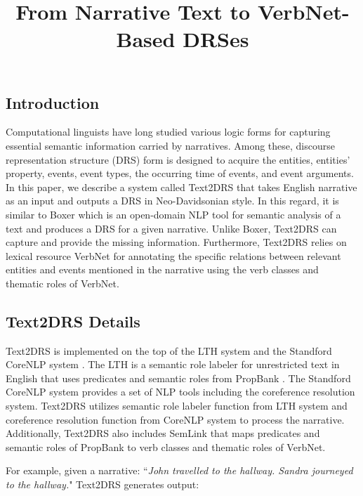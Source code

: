 \documentclass[12pt,letterpaper]{article}
\title{\vspace{-2.5cm}\myfont From Narrative Text to VerbNet-Based DRSes}
\author{}
\date{\vspace{-5ex}}
\begin{document}
	
	\maketitle
	\subsection*{\small Introduction}
	\noindent Computational linguists have long studied various logic forms for capturing essential semantic information carried by narratives. Among these, discourse representation structure (DRS) \citep{kampreyle93} form is designed to acquire the entities, entities’ property, events, event types, the occurring time of events, and event arguments. In this paper, we describe a system called Text2DRS that takes English narrative as an input and outputs a DRS in Neo-Davidsonian style. In this regard, it is similar to Boxer \citep{bos08} which is an open-domain NLP tool for semantic analysis of a text and produces a DRS for a given narrative. Unlike Boxer, Text2DRS can capture and provide the missing information. Furthermore, Text2DRS relies on lexical resource VerbNet \citep{KipperPhd05,verbneturl} for annotating the specific relations between relevant entities and events mentioned in the narrative using the verb classes and thematic roles of VerbNet. 
	
	\subsection*{\small Text2DRS Details}
	\noindent Text2DRS is implemented on the top of the LTH system \citep{lthurl} and the Standford CoreNLP system \citep{manning-EtAl:2014:P14-5}. The LTH is a semantic role labeler for unrestricted text in English that uses predicates and semantic roles from PropBank \citep{propbank}. The Standford CoreNLP system provides a set of NLP tools including the coreference resolution system. Text2DRS utilizes semantic role labeler function from LTH system and coreference resolution function from CoreNLP system to process the narrative. Additionally, Text2DRS also includes SemLink \citep{semlinkurl} that maps predicates and semantic roles of PropBank to verb classes and thematic roles of VerbNet. \par
	\vskip 0.05in
	\noindent For example, given a narrative: ``\textit{John travelled to the hallway. Sandra journeyed to the hallway.}" Text2DRS generates output:
	
\end{document}
